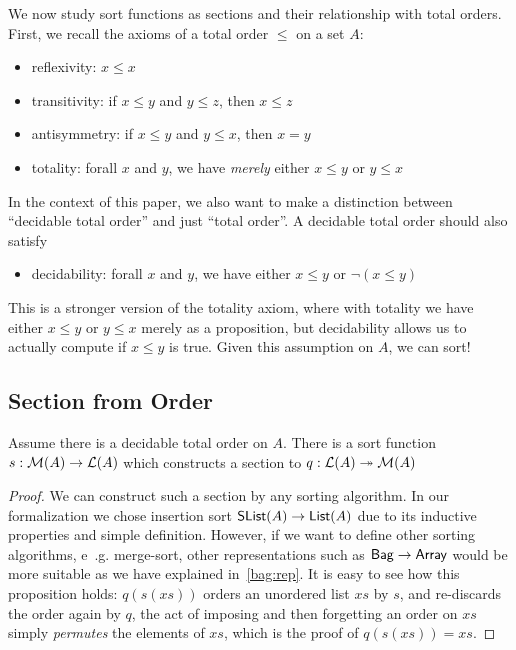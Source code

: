 We now study sort functions as sections and their relationship with total orders.
First, we recall the axioms of a total order $\leq$ on a set $A$:
\begin{itemize}
    \item reflexivity: $x \leq x$
    \item transitivity: if $x \leq y$ and $y \leq z$, then $x \leq z$
    \item antisymmetry: if $x \leq y$ and $y \leq x$, then $x = y$
    \item totality: forall $x$ and $y$, we have \emph{merely} either $x \leq y$ or $y \leq x$
\end{itemize}

In the context of this paper, we also want to make a distinction between ``decidable total order''
and just ``total order''. A decidable total order should also satisfy
\begin{itemize}
    \item decidability: forall $x$ and $y$, we have either $x \leq y$ or $\neg(x \leq y)$
\end{itemize}

This is a stronger version of the totality axiom, where with totality we have
either $x \leq y$ or $y \leq x$ merely as a proposition, but decidability allows us to actually
compute if $x \leq y$ is true. Given this assumption on $A$, we can sort!

\subsection{Section from Order}

\begin{proposition}
    Assume there is a decidable total order on $A$. There is a sort function $s: \mathcal{M}(A) \to \mathcal{L}(A)$
    which constructs a section to $q : \mathcal{L}(A) \twoheadrightarrow \mathcal{M}(A)$
\end{proposition}

\begin{proof}
    We can construct such a section by any sorting algorithm. In our formalization we chose
    insertion sort $\operatorname{\mathsf{SList}}(A) \to \operatorname{\mathsf{List}}(A)$ due to its inductive properties and simple definition.
    However, if we want to define other sorting algorithms, e .g. merge-sort,
    other representations such as $\operatorname{\mathsf{Bag}} \to \operatorname{\mathsf{Array}}$ would be more suitable as we have explained in~\cref{bag:rep}.
    It is easy to see how this
    proposition holds: $q(s(xs))$ orders an unordered list $xs$ by $s$, and re-discards the order again by
    $q$, the act of imposing and then forgetting an order on $xs$ simply \emph{permutes} the elements of $xs$,
    which is the proof of $q(s(xs)) = xs$.
\end{proof}

